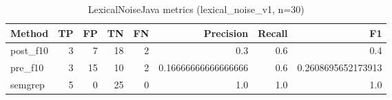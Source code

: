 \begin{table}[h]
\centering
\begin{tabular}{lrrrrrrr}
\hline
Method & TP & FP & TN & FN & Precision & Recall & F1 \\
\hline
post\_f10 & 3 & 7 & 18 & 2 & 0.3 & 0.6 & 0.4 \\
pre\_f10 & 3 & 15 & 10 & 2 & 0.16666666666666666 & 0.6 & 0.2608695652173913 \\
semgrep & 5 & 0 & 25 & 0 & 1.0 & 1.0 & 1.0 \\
\hline
\end{tabular}
\caption{LexicalNoiseJava metrics (lexical\_noise\_v1, n=30)}
\end{table}
